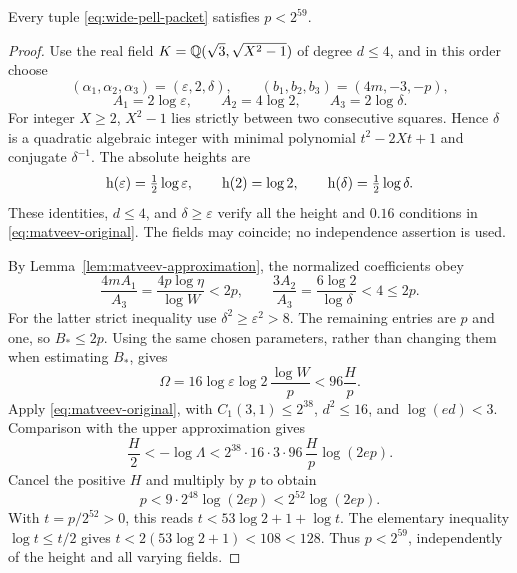 \begin{theorem}\label{thm:absolute-pell-index}
Every tuple \eqref{eq:wide-pell-packet} satisfies $p<2^{59}$.
\end{theorem}
\begin{proof}
Use the real field $K=\mathbb Q(\sqrt3,\sqrt{X^2-1})$ of degree $d\le4$,
and in this order choose
\[
 (\alpha_1,\alpha_2,\alpha_3)=(\varepsilon,2,\delta),\qquad
 (b_1,b_2,b_3)=(4m,-3,-p),
\]
\[
 A_1=2\log\varepsilon,\qquad A_2=4\log2,\qquad A_3=2\log\delta.
\]
For integer $X\ge2$, $X^2-1$ lies strictly between two consecutive
squares. Hence $\delta$ is a quadratic algebraic integer with minimal
polynomial $t^2-2Xt+1$ and conjugate $\delta^{-1}$.
The absolute heights are
\[
 \mathrm h(\varepsilon)=\tfrac12\log\varepsilon,\qquad
 \mathrm h(2)=\log2,\qquad \mathrm h(\delta)=\tfrac12\log\delta.
\]
These identities, $d\le4$, and $\delta\ge\varepsilon$ verify all the
height and $0.16$ conditions in \eqref{eq:matveev-original}.
The fields may coincide; no independence assertion is used.

By Lemma~\ref{lem:matveev-approximation}, the normalized coefficients obey
\[
 \frac{4mA_1}{A_3}
 =\frac{4p\log\eta}{\log W}<2p,\qquad
 \frac{3A_2}{A_3}=\frac{6\log2}{\log\delta}<4\le2p.
\]
For the latter strict inequality use $\delta^2\ge\varepsilon^2>8$.
The remaining entries are $p$ and one, so $B_*\le2p$.
Using the same chosen parameters, rather than changing them when
estimating $B_*$, gives
\[
 \Omega=16\log\varepsilon\log2\,\frac{\log W}{p}
 <96\frac Hp.
\]
Apply \eqref{eq:matveev-original}, with $C_1(3,1)\le2^{38}$,
$d^2\le16$, and $\log(ed)<3$. Comparison with the upper approximation
gives
\[
 \frac H2< -\log\Lambda
 <2^{38}\cdot16\cdot3\cdot96\,\frac Hp\log(2ep).
\]
Cancel the positive $H$ and multiply by $p$ to obtain
\begin{equation}\label{eq:matveev-index-absorption}
 p<9\cdot2^{48}\log(2ep)<2^{52}\log(2ep).
\end{equation}
With $t=p/2^{52}>0$, this reads
$t<53\log2+1+\log t$. The elementary inequality
$\log t\le t/2$ gives $t<2(53\log2+1)<108<128$.
Thus $p<2^{59}$, independently of the height and all varying fields.
\end{proof}

